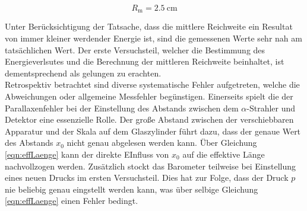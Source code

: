 \begin{equation*}
    R_\text{m} = \qty{2.5}{\centi\meter}
\end{equation*}

\noindent Unter Berücksichtigung der Tatsache, dass die mittlere Reichweite ein Resultat von immer kleiner werdender Energie
ist, sind die gemessenen Werte sehr nah am tatsächlichen Wert. Der erste Versuchsteil, welcher die Bestimmung des Energieverlsutes
und die Berechnung der mittleren Reichweite beinhaltet, ist dementsprechend als gelungen zu erachten.\\

Retrospektiv betrachtet sind diverse systematische Fehler aufgetreten, welche die Abweichungen oder allgemeine Messfehler 
begünstigen. Einerseits spielt die der Parallaxenfehler bei der Einstellung des Abstands zwischen dem $\alpha$-Strahler und 
Detektor eine essenzielle Rolle. Der große Abstand zwischen der verschiebbaren Apparatur und der Skala auf dem Glaszylinder 
führt dazu, dass der genaue Wert des Abstands $x_0$ nicht genau abgelesen werden kann. Über Gleichung \eqref{eqn:effLaenge}
kann der direkte EInfluss von $x_0$ auf die effektive Länge nachvollzogen werden. Zusätzlich stockt das Barometer teilweise 
bei Einstellung eines neuen Drucks im ersten Versuchsteil. Dies hat zur Folge, dass der Druck $p$ nie beliebig genau eingstellt
werden kann, was über selbige Gleichung \eqref{eqn:effLaenge} einen Fehler bedingt. 



